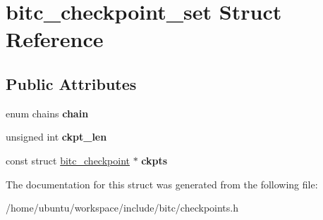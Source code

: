 \hypertarget{structbitc__checkpoint__set}{\section{bitc\-\_\-checkpoint\-\_\-set Struct Reference}
\label{structbitc__checkpoint__set}
}
\subsection*{Public Attributes}
\begin{DoxyCompactItemize}
\item 
\hypertarget{structbitc__checkpoint__set_a3e163dbd3da814a245ef6b1f2ca7409e}{enum chains {\bfseries chain}}\label{structbitc__checkpoint__set_a3e163dbd3da814a245ef6b1f2ca7409e}

\item 
\hypertarget{structbitc__checkpoint__set_a7386ad3448b09d980c183cbe81c015bd}{unsigned int {\bfseries ckpt\-\_\-len}}\label{structbitc__checkpoint__set_a7386ad3448b09d980c183cbe81c015bd}

\item 
\hypertarget{structbitc__checkpoint__set_aa566be485a1b8fa61ac7487ebb08af86}{const struct \hyperlink{structbitc__checkpoint}{bitc\-\_\-checkpoint} $\ast$ {\bfseries ckpts}}\label{structbitc__checkpoint__set_aa566be485a1b8fa61ac7487ebb08af86}

\end{DoxyCompactItemize}


The documentation for this struct was generated from the following file\-:\begin{DoxyCompactItemize}
\item 
/home/ubuntu/workspace/include/bitc/checkpoints.\-h\end{DoxyCompactItemize}
